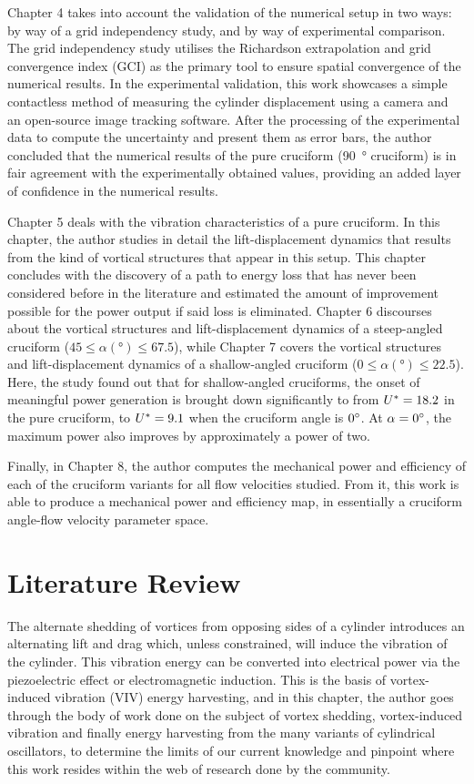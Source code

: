 \documentclass[oneside]{utmthesis}
\begin{document}
Chapter 4 takes into account the validation of the numerical setup in two ways: by way of a grid independency study, and by way of experimental comparison. The grid independency study utilises the Richardson extrapolation and grid convergence index (GCI) as the primary tool to ensure spatial convergence of the numerical results. In the experimental validation, this work showcases a simple contactless method of measuring the cylinder displacement using a camera and an open-source image tracking software. After the processing of the experimental data to compute the uncertainty and present them as error bars, the author concluded that the numerical results of the pure cruciform (\SI{90}{\degree} cruciform) is in fair agreement with the experimentally obtained values, providing an added layer of confidence in the numerical results.

Chapter 5 deals with the vibration characteristics of a pure cruciform. In this chapter, the author studies in detail the lift-displacement dynamics that results from the kind of vortical structures that appear in this setup. This chapter concludes with the discovery of a path to energy loss that has never been considered before in the literature and estimated the amount of improvement possible for the power output if said loss is eliminated. Chapter 6 discourses about the vortical structures and lift-displacement dynamics of a steep-angled cruciform ($45 \le \alpha (\si{\degree}) \le 67.5$), while Chapter 7 covers the vortical structures and lift-displacement dynamics of a shallow-angled cruciform ($0 \le \alpha (\si{\degree}) \le 22.5$). Here, the study found out that for shallow-angled cruciforms, the onset of meaningful power generation is brought down significantly to from $U^{*} = 18.2$ in the pure cruciform, to $U^{*} = 9.1$ when the cruciform angle is $\angon$. At $\alpha = \angon$, the maximum power also improves by approximately a power of two.

Finally, in Chapter 8, the author computes the mechanical power and efficiency of each of the cruciform variants for all flow velocities studied. From it, this work is able to produce a mechanical power and efficiency map, in essentially a cruciform angle-flow velocity parameter space.

\chapter{Literature Review} \label{chap:literatureReview}
The alternate shedding of vortices from opposing sides of a cylinder introduces an alternating lift and drag which, unless constrained, will induce the vibration of the cylinder. This vibration energy can be converted into electrical power via the piezoelectric effect or electromagnetic induction. This is the basis of vortex-induced vibration (VIV) energy harvesting, and in this chapter, the author goes through the body of work done on the subject of vortex shedding, vortex-induced vibration and finally energy harvesting from the many variants of cylindrical oscillators, to determine the limits of our current knowledge and pinpoint where this work resides within the web of research done by the community.
\end{document}
